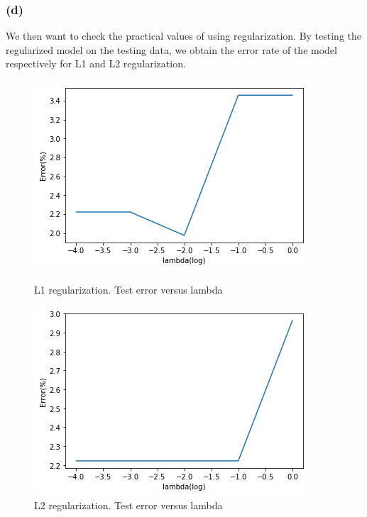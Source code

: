 \documentclass{article}
\begin{document}
\subsubsection*{(d)}
We then want to check the practical values of using regularization. By testing the regularized model on the testing data, we obtain the error rate of the model respectively for L1 and L2 regularization.
\begin{figure}[h]
	\begin{minipage}{0.48\textwidth}
		\centering
	\includegraphics[width=\textwidth]{lambda_test_1.png}
	\caption{L1 regularization. Test error versus lambda}
	\end{minipage}\hfill
	\begin {minipage}{0.48\textwidth}
	\centering
	\includegraphics[width=\textwidth]{lambda_test_2.png}
	\caption{L2 regularization. Test error versus lambda}
\end{minipage}
\end{figure}
\end{document}
